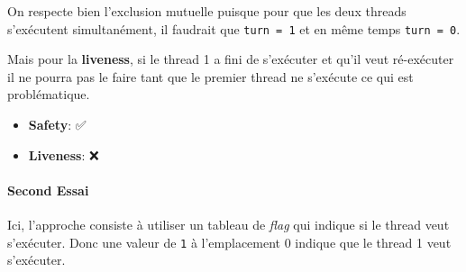 \begin{Shaded}
\begin{Highlighting}[]
 \OperatorTok{(}\OperatorTok{!=}\OperatorTok{)} \OperatorTok{\{} 
\OperatorTok{\}} 
\OperatorTok{();}
\OperatorTok{=}\OperatorTok{;}

 \OperatorTok{(}\OperatorTok{!=}\OperatorTok{)} \OperatorTok{\{}
\OperatorTok{\}} 
\OperatorTok{();}
\OperatorTok{=}\OperatorTok{;}
\end{Highlighting}
\end{Shaded}

On respecte bien l'exclusion mutuelle puisque pour que les deux threads
s'exécutent simultanément, il faudrait que \texttt{turn\ =\ 1} et en
même temps \texttt{turn\ =\ 0}.

Mais pour la \textbf{liveness}, si le thread 1 a fini de s'exécuter et
qu'il veut ré-exécuter il ne pourra pas le faire tant que le premier
thread ne s'exécute ce qui est problématique.

\begin{itemize}
\tightlist
\item
  \textbf{Safety}: ✅
\item
  \textbf{Liveness}: ❌
\end{itemize}

\paragraph{Second Essai}\label{second-essai}

Ici, l'approche consiste à utiliser un tableau de \emph{flag} qui
indique si le thread veut s'exécuter. Donc une valeur de \texttt{1} à
l'emplacement 0 indique que le thread 1 veut s'exécuter.

\begin{Shaded}
\begin{Highlighting}[]
 \OperatorTok{(}\OperatorTok{[}\OperatorTok{]==}\OperatorTok{)} \OperatorTok{\{}
\OperatorTok{\}}
\OperatorTok{[}\OperatorTok{]=}\OperatorTok{;}
\OperatorTok{();}
\OperatorTok{[}\OperatorTok{]=}\OperatorTok{;}

 \OperatorTok{(}\OperatorTok{[}\OperatorTok{]==}\OperatorTok{)} \OperatorTok{\{} 
\OperatorTok{\}} 
\OperatorTok{[}\OperatorTok{]=}\OperatorTok{;}
\OperatorTok{();}
\OperatorTok{[}\OperatorTok{]=}\OperatorTok{;}
\end{Highlighting}
\end{Shaded}

